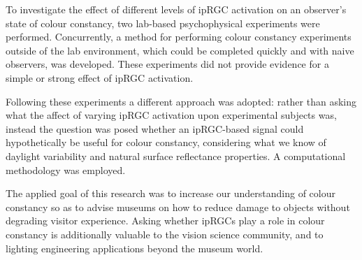 \documentclass{article}
\begin{document}
To investigate the effect of different levels of ipRGC activation on an observer's state of colour constancy,	two lab-based psychophysical experiments were performed. Concurrently, a method for performing colour constancy experiments outside of the lab environment, which could be completed quickly and with naive observers, was developed. These experiments did not provide evidence for a simple or strong effect of ipRGC activation.

Following these experiments a different approach was adopted: rather than asking what the affect of varying ipRGC activation upon experimental subjects was, instead the question was posed whether an ipRGC-based signal could hypothetically be useful for colour constancy, considering what we know of daylight variability and natural surface reflectance properties. A computational methodology was employed.

The applied goal of this research was to increase our understanding of colour constancy so as to advise museums on how to reduce damage to objects without degrading visitor experience. Asking whether ipRGCs play a role in colour constancy is additionally valuable to the vision science community, and to lighting engineering applications beyond the museum world.
\end{document}
